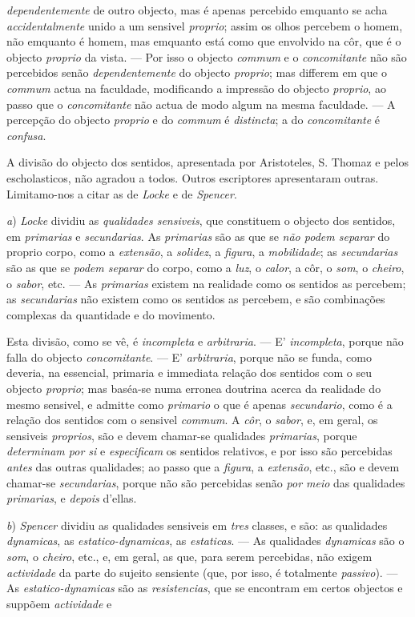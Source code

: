 \emph{dependentemente} de outro objecto, mas é apenas percebido emquanto se acha \emph{accidentalmente} unido a um sensivel \emph{proprio}; assim os olhos percebem o homem, não emquanto é homem, mas emquanto está como que envolvido na côr, que é o objecto \emph{proprio} da vista. --- Por isso o objecto \emph{commum} e o \emph{concomitante} não são percebidos senão \emph{dependentemente} do objecto \emph{proprio}; mas differem em que o \emph{commum} actua na faculdade, modificando a impressão do objecto \emph{proprio}, ao passo que o \emph{concomitante} não actua de modo algum na mesma faculdade. --- A percepção do objecto \emph{proprio} e do \emph{commum} é \emph{distincta}; a do \emph{concomitante} é \emph{confusa}.\par A divisão do objecto dos sentidos, apresentada por Aristoteles, S. Thomaz e pelos escholasticos, não agradou a todos. Outros escriptores apresentaram outras. Limitamo-nos a citar as de \emph{Locke} e de \emph{Spencer}.\par \emph{a}) \emph{Locke} dividiu as \emph{qualidades sensiveis}, que constituem o objecto dos sentidos, em \emph{primarias} e \emph{secundarias}. As \emph{primarias} são as que se \emph{não podem separar} do proprio corpo, como a \emph{extensão}, a \emph{solidez}, a \emph{figura}, a \emph{mobilidade}; as \emph{secundarias} são as que se \emph{podem separar} do corpo, como a \emph{luz}, o \emph{calor}, a côr, o \emph{som}, o \emph{cheiro}, o \emph{sabor}, etc. --- As \emph{primarias} existem na realidade como os sentidos as percebem; as \emph{secundarias} não existem como os sentidos as percebem, e são combinações complexas da quantidade e do movimento.\par Esta divisão, como se vê, é \emph{incompleta} e \emph{arbitraria}. --- E' \emph{incompleta}, porque não falla do objecto \emph{concomitante}. --- E' \emph{arbitraria}, porque não se funda, como deveria, na essencial, primaria e immediata relação dos sentidos com o seu objecto \emph{proprio}; mas baséa-se numa erronea doutrina acerca da realidade do mesmo sensivel, e admitte como \emph{primario} o que é apenas \emph{secundario}, como é a relação dos sentidos com o sensivel \emph{commum}. A \emph{côr}, o \emph{sabor}, e, em geral, os sensiveis \emph{proprios}, são e devem chamar-se qualidades \emph{primarias}, porque \emph{determinam por si} e \emph{especificam} os sentidos relativos, e por isso são percebidas \emph{antes} das outras qualidades; ao passo que a \emph{figura}, a \emph{extensão}, etc., são e devem chamar-se \emph{secundarias}, porque não são percebidas senão \emph{por meio} das qualidades \emph{primarias}, e \emph{depois} d'ellas.\par \emph{b}) \emph{Spencer} dividiu as qualidades sensiveis em \emph{tres} classes, e são: as qualidades \emph{dynamicas}, as \emph{estatico-dynamicas}, as \emph{estaticas}. --- As qualidades \emph{dynamicas} são o \emph{som}, o \emph{cheiro}, etc., e, em geral, as que, para serem percebidas, não exigem \emph{actividade} da parte do sujeito sensiente (que, por isso, é totalmente \emph{passivo}). --- As \emph{estatico-dynamicas} são as \emph{resistencias}, que se encontram em certos objectos e suppõem \emph{actividade} e 